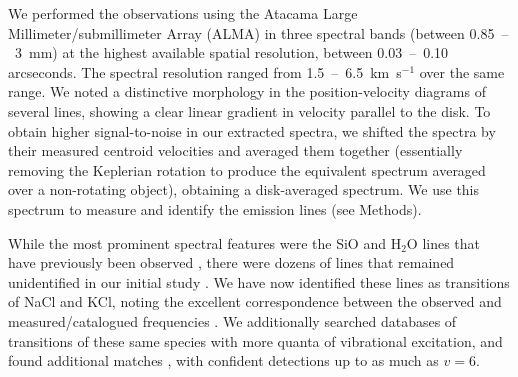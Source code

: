 \documentclass[12pt]{article}
\newcommand{\bam}[1]{\textcolor{green!65!black}{\textbf{[BAM: #1]}}}
\newcommand{\water}{H$_{2}$O\xspace}		%
\newcommand{\kms}{\textrm{km~s}\ensuremath{^{-1}}\xspace}	%
\begin{document}


We performed the observations using the Atacama Large Millimeter/submillimeter Array (ALMA) in three spectral bands (between 0.85~--~3~mm) at the highest available spatial resolution, between 0.03~--~0.10 arcseconds. The spectral resolution ranged from 1.5~--~6.5~\kms over the same range.  We noted a distinctive morphology in the position-velocity diagrams of several lines, showing a clear linear gradient in velocity parallel to the disk. To obtain higher signal-to-noise in our extracted spectra, we shifted the spectra by their measured centroid velocities and averaged them together (essentially removing  the Keplerian rotation to produce the equivalent spectrum averaged over a non-rotating object), obtaining a disk-averaged spectrum.  We use this spectrum to measure and  identify the emission lines (see Methods).


While the most prominent spectral features were the SiO and \water lines that have previously been observed \cite{Goddi2013a,Hirota2014a}, there were dozens of lines that remained unidentified in our initial study \cite{Ginsburg2018b}. We have now identified these lines as transitions of NaCl and KCl, noting the excellent correspondence between the observed and measured/catalogued frequencies \cite{Caris2002a,Caris2004a,Muller2005a,Lovas2005a,Pickett1998a}. We additionally searched databases of transitions of these same species with more quanta of vibrational excitation, and found additional matches \cite{Barton2014a,Cabezas2016a}, with confident detections up to as much as $v=6$. %
\end{document}
